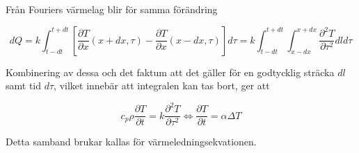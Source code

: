 Från Fouriers värmelag blir för samma förändring

\begin{equation}
dQ = k\int_{t-dt}^{t+dt} \left[ \frac{\partial T}{\partial x}\left( x + dx, \tau \right) - \frac{\partial T}{\partial x}\left( x-dx, \tau \right)\right]d\tau = k\int_{t-dt}^{t+dt} \int_{x-dx}^{x+dx} \frac{\partial^2 T}{\partial \tau^2} dld\tau
\end{equation}

Kombinering av dessa och det faktum att det gäller för en godtycklig sträcka $dl$ samt tid $d\tau$, vilket innebär att integralen kan tas bort, ger att

\begin{equation}\label{eq:conduction:heateq}\boxed{ \; \; \;
c_p \rho \frac{\partial T}{\partial t} = k \frac{\partial^2 T}{\partial \tau^2} \Leftrightarrow \frac{\partial T}{\partial t} = \alpha \Delta T
\; \; \; }
\end{equation}

Detta samband brukar kallas för värmeledningsekvationen.
